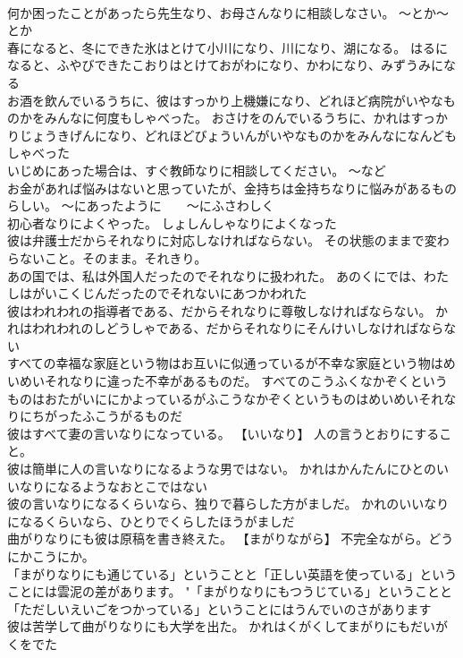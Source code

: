 \documentclass[8pt]{extreport}
\begin{document}
\begin{CJK}{UTF8}{min}
\\	何か困ったことがあったら先生なり、お母さんなりに相談しなさい。	～とか～とか
\\	春になると、冬にできた氷はとけて小川になり、川になり、湖になる。	はるになると、ふやびできたこおりはとけておがわになり、かわになり、みずうみになる 
\\	お酒を飲んでいるうちに、彼はすっかり上機嫌になり、どれほど病院がいやなものかをみんなに何度もしゃべった。	おさけをのんでいるうちに、かれはすっかりじょうきげんになり、どれほどびょういんがいやなものかをみんなになんどもしゃべった 
\\	いじめにあった場合は、すぐ教師なりに相談してください。	～など
\\	お金があれば悩みはないと思っていたが、金持ちは金持ちなりに悩みがあるものらしい。	～にあったように　　～にふさわしく
\\	初心者なりによくやった。	しょしんしゃなりによくなった 
\\	彼は弁護士だからそれなりに対応しなければならない。	その状態のままで変わらないこと。そのまま。それきり。
\\	あの国では、私は外国人だったのでそれなりに扱われた。	あのくにでは、わたしはがいこくじんだったのでそれないにあつかわれた 
\\	彼はわれわれの指導者である、だからそれなりに尊敬しなければならない。	かれはわれわれのしどうしゃである、だからそれなりにそんけいしなければならない 
\\	すべての幸福な家庭という物はお互いに似通っているが不幸な家庭という物はめいめいそれなりに違った不幸があるものだ。	すべてのこうふくなかぞくというものはおたがいににかよっているがふこうなかぞくというものはめいめいそれなりにちがったふこうがるものだ 
\\	彼はすべて妻の言いなりになっている。	【いいなり】 人の言うとおりにすること。
\\	彼は簡単に人の言いなりになるような男ではない。	かれはかんたんにひとのいいなりになるようなおとこではない 
\\	彼の言いなりになるくらいなら、独りで暮らした方がましだ。	かれのいいなりになるくらいなら、ひとりでくらしたほうがましだ 
\\	曲がりなりにも彼は原稿を書き終えた。	【まがりながら】 不完全ながら。どうにかこうにか。
\\	「まがりなりにも通じている」ということと「正しい英語を使っている」ということには雲泥の差があります。	"「まがりなりにもつうじている」ということと「ただしいえいごをつかっている」ということにはうんでいのさがあります 
\\	彼は苦学して曲がりなりにも大学を出た。	かれはくがくしてまがりにもだいがくをでた 

\end{CJK}
\end{document}
